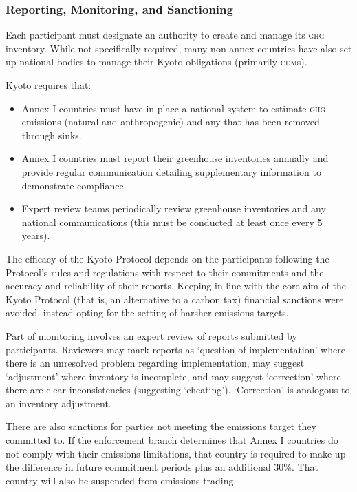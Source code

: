 \subsubsection{Reporting, Monitoring, and Sanctioning}

Each participant must designate an authority to create and manage its \textsc{ghg} inventory. While not specifically required, many non-annex countries have also set up national bodies to manage their Kyoto obligations (primarily \textsc{cdm}s).

Kyoto requires that:~\cite{UNFCCC-Kyoto-guidelines}

\begin{itemize}
	\item Annex I countries must have in place a national system to estimate \textsc{ghg} emissions (natural and anthropogenic) and any \CO that has been removed through sinks.
	\item Annex I countries must report their greenhouse inventories annually and provide regular communication detailing supplementary information to demonstrate compliance.
	\item Expert review teams periodically review greenhouse inventories and any national communications (this must be conducted at least once every 5 years).
\end{itemize}

The efficacy of the Kyoto Protocol depends on the participants following the Protocol's rules and regulations with respect to their commitments and the accuracy and reliability of their reports. Keeping in line with the core aim of the Kyoto Protocol (that is, an alternative to a carbon tax) financial sanctions were avoided, instead opting for the setting of harsher emissions targets.

Part of monitoring involves an expert review of reports submitted by participants. Reviewers may mark reports as `question of implementation' where there is an unresolved problem regarding implementation, may suggest `adjustment' where inventory is incomplete, and may suggest `correction' where there are clear inconsistencies (suggesting `cheating'). `Correction' is analogous to an inventory adjustment.~\cite{UNFCCC-reporting-review}

There are also sanctions for parties not meeting the emissions target they committed to. If the enforcement branch determines that Annex I countries do not comply with their emissions limitations, that country is required to make up the difference in future commitment periods plus an additional 30\%. That country will also be suspended from emissions trading.~\cite{UNFCCC-compliance}


